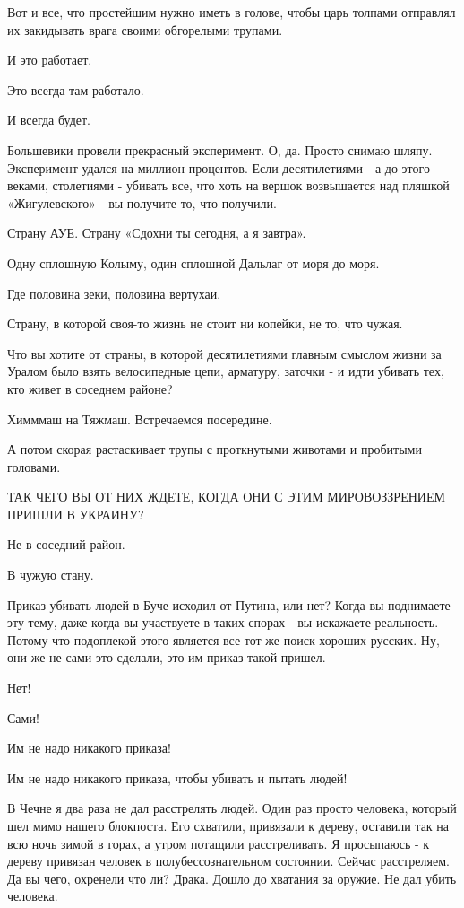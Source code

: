Вот и все, что простейшим нужно иметь в голове, чтобы царь толпами отправлял их
закидывать врага своими обгорелыми трупами. 

И это работает. 

Это всегда там работало. 

И всегда будет. 

Большевики провели прекрасный эксперимент. О, да. Просто снимаю шляпу.
Эксперимент удался на миллион процентов. Если десятилетиями - а до этого
веками, столетиями - убивать все, что хоть на вершок возвышается над пляшкой
«Жигулевского» - вы получите то, что получили. 

Страну АУЕ. Страну «Сдохни ты сегодня, а я завтра». 

Одну сплошную Колыму, один сплошной Дальлаг от моря до моря. 

Где половина зеки, половина вертухаи.

Страну, в которой своя-то жизнь не стоит ни копейки, не то, что чужая. 

Что вы хотите от страны, в которой десятилетиями главным смыслом жизни за
Уралом было взять велосипедные цепи, арматуру, заточки - и идти убивать тех,
кто живет в соседнем районе? 

Химммаш на Тяжмаш. Встречаемся посередине. 

А потом скорая растаскивает трупы с проткнутыми животами и пробитыми головами. 

ТАК ЧЕГО ВЫ ОТ НИХ ЖДЕТЕ, КОГДА ОНИ С ЭТИМ МИРОВОЗЗРЕНИЕМ ПРИШЛИ В УКРАИНУ?

Не в соседний район.

В чужую стану.

Приказ убивать людей в Буче исходил от Путина, или нет? Когда вы поднимаете эту
тему, даже когда вы участвуете в таких спорах - вы искажаете реальность. Потому
что подоплекой этого является все тот же поиск хороших русских. Ну, они же не
сами это сделали, это им приказ такой пришел.

Нет! 

Сами! 

Им не надо никакого приказа!

Им не надо никакого приказа, чтобы убивать и пытать людей!

В Чечне я два раза не дал расстрелять людей. Один раз просто человека, который
шел мимо нашего блокпоста. Его схватили, привязали к дереву, оставили так на
всю ночь зимой в горах, а утром потащили расстреливать. Я просыпаюсь - к дереву
привязан человек в полубессознательном состоянии. Сейчас расстреляем. Да вы
чего, охренели что ли? Драка. Дошло до хватания за оружие. Не дал убить
человека.

